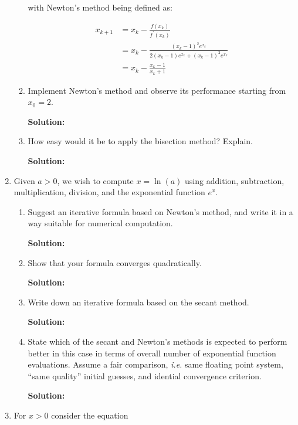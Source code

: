 \documentclass[12pt]{article}
\begin{document}
\begin{enumerate}
\begin{enumerate}
with Newton's method being defined as:

\begin{align*}
x_{k+1} &= x_{k} - \frac{f\left(x_{k}\right)}{f^{\prime}\left(x_{k}\right)}\\
        &= x_{k} - \frac{\left(x_{k}-1\right)^{2}e^{x_{k}}}{2\left(x_{k}-1\right)e^{x_{k}} + \left( x_{k} - 1\right)^{2}e^{x_{k}}}\\
        &= x_{k} - \frac{x_{k}-1}{x_{k} + 1}
\end{align*}

\item Implement Newton's method and observe its performance starting from $x_{0} = 2$.

{\bf Solution:}

\item How easy would it be to apply the bisection method? Explain.

{\bf Solution:}

\end{enumerate}

\item Given $a > 0$, we wish to compute $x = \ln (a)$ using addition, subtraction, multiplication,
division, and the exponential function $e^{x}$.
\begin{enumerate}
\item Suggest an iterative formula based on Newton's method, and write it in a way suitable
for numerical computation.

{\bf Solution:}

\item Show that your formula converges quadratically.

{\bf Solution:}

\item Write down an iterative formula based on the secant method.

{\bf Solution:}

\item State which of the secant and Newton's methods is expected to perform better in
this case in terms of overall number of exponential function evaluations. Assume a fair
comparison, {\em i.e.} same floating point system, ``same quality'' initial guesses, and idential
convergence criterion.

{\bf Solution:}

\end{enumerate}

\item For $x>0$ consider the equation


\end{enumerate}
\end{document}
